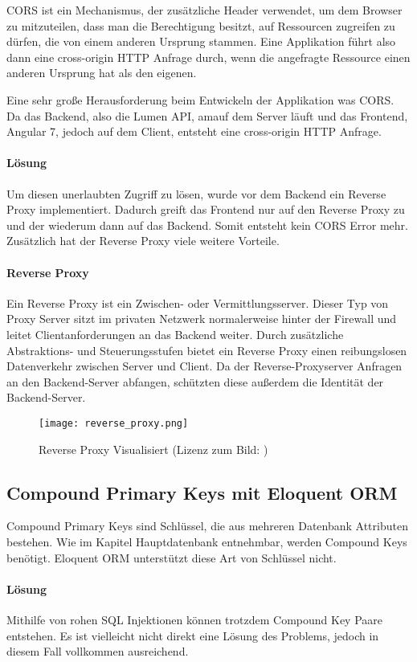 CORS\cite{CORS} ist ein Mechanismus, der zusätzliche Header verwendet, um dem Browser zu mitzuteilen, dass man die Berechtigung besitzt, auf Ressourcen zugreifen zu dürfen, die von einem anderen Ursprung stammen. Eine Applikation führt also dann eine cross-origin HTTP Anfrage durch, wenn die angefragte Ressource einen anderen Ursprung hat als den eigenen.

Eine sehr große Herausforderung beim Entwickeln der Applikation was CORS. Da das Backend, also die Lumen API, amauf dem Server läuft und das Frontend, Angular 7, jedoch auf dem Client, entsteht eine cross-origin HTTP Anfrage.

\paragraph{Lösung}

Um diesen unerlaubten Zugriff zu lösen, wurde vor dem Backend ein Reverse Proxy implementiert. Dadurch greift das Frontend nur auf den Reverse Proxy zu und der wiederum dann auf das Backend. Somit entsteht kein CORS Error mehr. Zusätzlich hat der Reverse Proxy viele weitere Vorteile.

\paragraph{Reverse Proxy}

Ein Reverse Proxy\cite{ReverseProxy} ist ein Zwischen- oder Vermittlungsserver. Dieser Typ von Proxy Server sitzt im privaten Netzwerk normalerweise hinter der Firewall und leitet Clientanforderungen an das Backend weiter. Durch zusätzliche Abstraktions- und Steuerungsstufen bietet ein Reverse Proxy einen reibungslosen Datenverkehr zwischen Server und Client. Da der Reverse-Proxyserver Anfragen an den Backend-Server abfangen, schützten diese außerdem die Identität der Backend-Server.

\begin{figure}[H] 
\centering 
\texttt{[image: reverse\_proxy.png]} 
\caption{Reverse Proxy Visualisiert (Lizenz zum Bild: \cite{BildReverseProxy})} 
\end{figure}

\subsection{Compound Primary Keys mit Eloquent ORM}

Compound Primary Keys sind Schlüssel, die aus mehreren Datenbank Attributen bestehen. Wie im Kapitel Hauptdatenbank entnehmbar, werden Compound Keys benötigt. Eloquent ORM unterstützt diese Art von Schlüssel nicht.

\paragraph{Lösung}

Mithilfe von rohen SQL Injektionen können trotzdem Compound Key Paare entstehen. Es ist vielleicht nicht direkt eine Lösung des Problems, jedoch in diesem Fall vollkommen ausreichend.
